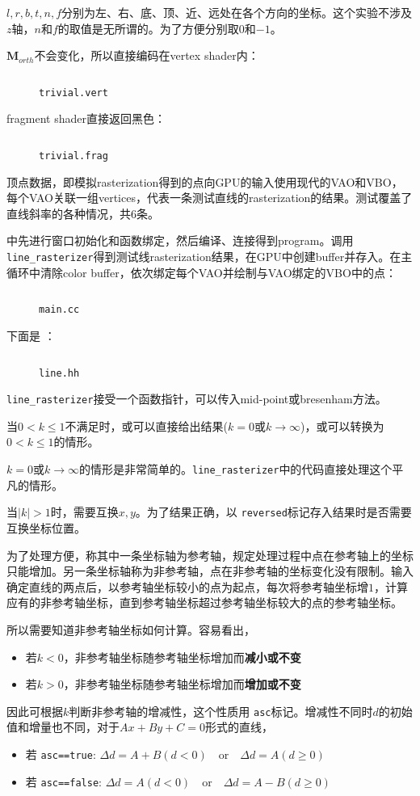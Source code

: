 \documentclass{cumtbrep}
\newcommand\inputcode[3][c++]{%
	\inputminted{#1}{#2}
	\begin{figure}[H]
		\centering
		\captionsetup{type=table}
		\caption{\texttt{#3}}
	\end{figure}
}
\newcommand\inline[1]{\texttt{#1}}
\begin{document}
$l, r, b, t, n, f$分别为左、右、底、顶、近、远处在各个方向的坐标。这个实验不涉及$z$轴，$n$和$f$的取值是无所谓的。为了方便分别取$0$和$-1$。

$\mathbf{M}_{\mathit{orth}}$不会变化，所以直接编码在vertex shader内：
\inputcode[glsl]{../line/trivial.vert}{trivial.vert}

fragment shader直接返回黑色：
\inputcode[glsl]{../line/trivial.frag}{trivial.frag}

顶点数据，即模拟rasterization得到的点向GPU的输入使用现代的VAO和VBO，每个VAO关联一组vertices，代表一条测试直线的rasterization的结果。测试覆盖了直线斜率的各种情况，共6条。

中先进行窗口初始化和函数绑定，然后编译、连接得到program。调用 \inline{line_rasterizer}得到测试线rasterization结果，在GPU中创建buffer并存入。在主循环中清除color buffer，依次绑定每个VAO并绘制与VAO绑定的VBO中的点：
\inputcode{../line/main.cc}{main.cc}

下面是 ：\inputcode{../line/line.hh}{line.hh}

\inline{line_rasterizer}接受一个函数指针，可以传入mid-point或bresenham方法。

当$0<k\le 1$不满足时，或可以直接给出结果($k=0$或$k\to\infty$)，或可以转换为$0<k\le 1$的情形。

$k=0$或$k\to\infty$的情形是非常简单的。\inline{line_rasterizer}中的代码直接处理这个平凡的情形。

当$|k|>1$时，需要互换$x,y$。为了结果正确，以 \inline{reversed}标记存入结果时是否需要互换坐标位置。

为了处理方便，称其中一条坐标轴为参考轴，规定处理过程中点在参考轴上的坐标只能增加。另一条坐标轴称为非参考轴，点在非参考轴的坐标变化没有限制。输入确定直线的两点后，以参考轴坐标较小的点为起点，每次将参考轴坐标增$1$，计算应有的非参考轴坐标，直到参考轴坐标超过参考轴坐标较大的点的参考轴坐标。

所以需要知道非参考轴坐标如何计算。容易看出，
\begin{itemize}
	\item 若$k<0$，非参考轴坐标随参考轴坐标增加而\textbf{减小或不变}
	\item 若$k>0$，非参考轴坐标随参考轴坐标增加而\textbf{增加或不变}
\end{itemize}

因此可根据$k$判断非参考轴的增减性，这个性质用 \inline{asc}标记。增减性不同时$d$的初始值和增量也不同，对于$Ax+By+C=0$形式的直线，
\begin{itemize}
	\item 若 \inline{asc==true}: $\Delta d = A+B(d<0) \quad \text{or} \quad \Delta d=A(d\ge 0)$
	\item 若 \inline{asc==false}: $\Delta d = A(d<0) \quad \text{or} \quad \Delta d=A-B(d\ge 0)$
\end{itemize}
\end{document}
